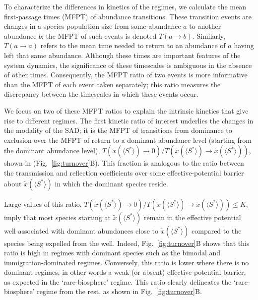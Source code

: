 \documentclass[9pt,twocolumn,twoside,lineno]{pnas-new}
\begin{document}
To characterize the differences in kinetics of the regimes, we calculate the mean first-passage times (MFPT) of abundance transitions.
These transition events are changes in a species population size from some abundance $a$ to another abundance $b$: the MFPT of such events is denoted $T(a \rightarrow b)$.
Similarly, $T(a\rightarrow a)$ refers to the mean time needed to return to an abundance of $a$ having left that same abundance.
Although these times are important features of the system dynamics, the significance of these timescales is ambiguous in the absence of other times.
Consequently, the MFPT ratio of two events is more informative than the MFPT of each event taken separately; this ratio measures the discrepancy between the timescales in which these events occur. 

We focus on two of these MFPT ratios to explain the intrinsic kinetics that give rise to different regimes.
The first kinetic ratio of interest underlies the changes in the modality of the SAD; it is the MFPT of transitions from dominance to exclusion over the MFPT of return to a dominant abundance level (starting from the dominant abundance level), $T(\tilde{x}(\langle S^* \rangle )\rightarrow 0) / T(\tilde{x}(\langle S^* \rangle )\rightarrow \tilde{x}(\langle S^* \rangle ))$, shown in (Fig.~\ref{fig:turnover}B).
This fraction is analogous to the ratio between the transmission and reflection coefficients over some effective-potential barrier about $\tilde{x}(\langle S^* \rangle )$ in which the dominant species reside.

Large values of this ratio, $T(\tilde{x}(\langle S^* \rangle )\rightarrow 0)/ T(\tilde{x}(\langle S^* \rangle )\rightarrow \tilde{x}(\langle S^* \rangle )) \leq K$, imply that most species starting at $\tilde{x}(\langle S^* \rangle )$ remain in the effective potential well associated with dominant abundances close to $\tilde{x}(\langle S^* \rangle )$ compared to the species being expelled from the well.
Indeed, Fig.~\ref{fig:turnover}B shows that this ratio is high in regimes with dominant species such as the bimodal and immigration-dominated regimes.
Conversely, this ratio is lower where there is no dominant regimes, in other words a weak (or absent) effective-potential barrier, as expected in the `rare-biosphere' regime. 
This ratio clearly delineates the  `rare-biosphere' regime from the rest, as shown in Fig.~\ref{fig:turnover}B. %
\end{document}
